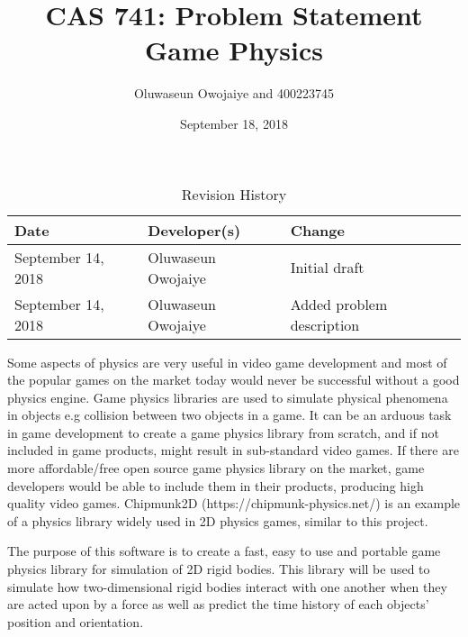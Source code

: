 \documentclass [12pt] {article}
\title{CAS 741: Problem Statement\\Game Physics}
\author{Oluwaseun Owojaiye and 400223745}
\date{September 18, 2018}
\begin{document}
\maketitle

\begin{table}[hp] \caption{Revision History} \label{TblRevisionHistory}
\begin{tabularx}{\textwidth}{llX} 
\toprule 
\textbf{Date} & \textbf{Developer(s)} & \textbf{Change}\\ 
\midrule September 14, 2018 & Oluwaseun Owojaiye & Initial draft\\ 
September 14, 2018 & Oluwaseun Owojaiye & Added problem description\\
\bottomrule 
\end{tabularx} 
\end{table}

Some aspects of physics are very useful in video game development and most of
the popular games on the market today would never be successful without a good
physics engine. Game physics libraries are used to simulate physical phenomena
in objects e.g collision between two objects in a game. It can be an arduous
task in game development to create a game physics library from scratch, and if
not included in game products, might result in sub-standard video games. If
there are more affordable/free open source game physics library on the market,
game developers would be able to include them in their products, producing high
quality video games. Chipmunk2D (https://chipmunk-physics.net/) is an example of
a physics library widely used in 2D physics games, similar to this project.

The purpose of this software is to create a fast, easy to use and portable game
physics library for simulation of 2D rigid bodies. This library will be used to
simulate how two-dimensional rigid bodies interact with one another when they
are acted upon by a force as well as predict the time history of each objects'
position and orientation.
\end{document}
